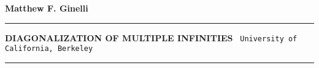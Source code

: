 \documentclass[a4paper,12pt]{article}
\newcommand{\titleline}[1]{\noindent\rule{\textwidth}{#1}}
\begin{document}
\vspace*{\fill}

\begin{center}

\textbf{Matthew F. Ginelli}

\end{center}
\titleline{5pt}

\begin{center}
\bigskip
\textbf{DIAGONALIZATION OF MULTIPLE INFINITIES}\
\smallskip
\texttt{University of California, Berkeley}
\medskip
\end{center}

\titleline{5pt}
\vspace*{\fill}
\end{document}

